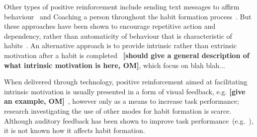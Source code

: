 \documentclass{scaffold/sigchi}
\begin{document}
%

Other types of positive reinforcement include sending text messages to affirm behaviour~\cite{chi_crowd_designed_motivation} and Coaching a person throughout the habit formation process~\cite{coaching_not_that_good}. But these approaches have been shown to encourage repetitive action and dependency, rather than automaticity of behaviour that is characteristic of habits~\cite{habits_as_automaticity_not_frequency_gardner}.
%
An alternative approach is to provide intrinsic rather than extrinsic motivation after a habit is completed~\cite{article_a_self_efficacy, article_meta_analytic_review_intrinsic_motivation} \textbf{[should give a general description of what intrinsic motivation is here, OM]}, which focus on blah blah...

When delivered through technology, positive reinforcement aimed at facilitating intrinsic motivation is usually presented in a form of visual feedback, e.g. \textbf{[give an example, OM]}~\cite{comparison_of_auditory_visual_feedback, visual_mode_better, article_realtime_feedback_improving_medication_taking}, 
%
however only as a means to increase task performance; 
%
research investigating the use of other modes for habit formation is scarce. 
%
Although auditory feedback has been shown to improve task performance~(e.g.~\cite{burke2006comparing, vazquez2012auditory, chi_oussama_tap_the_shapetones}), it is not known how it affects habit formation.

\end{document}
